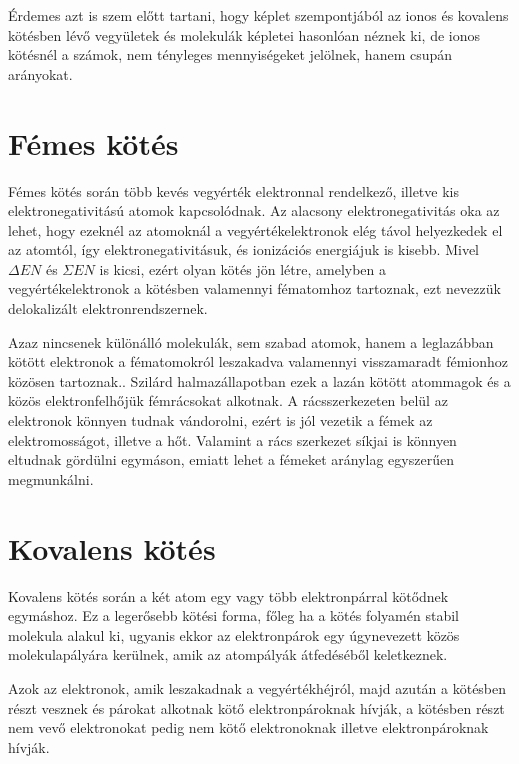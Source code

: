 \documentclass[colorlinks]{thesis-ekf}
\theoremstyle{definition}
\theoremstyle{remark}
\begin{document}
Érdemes azt is szem előtt tartani, hogy képlet szempontjából az ionos és kovalens kötésben lévő vegyületek és molekulák képletei hasonlóan néznek ki, de ionos kötésnél a számok, nem tényleges mennyiségeket jelölnek, hanem csupán arányokat.\cite{ionos_vidi}
\section{Fémes kötés}

Fémes kötés során több kevés vegyérték elektronnal rendelkező, illetve kis elektronegativitású atomok kapcsolódnak. Az alacsony elektronegativitás oka az lehet, hogy ezeknél az atomoknál a vegyértékelektronok elég távol helyezkedek el az atomtól, így elektronegativitásuk, és ionizációs energiájuk is kisebb. Mivel \begin{math}\Delta EN\end{math} és \begin{math}\Sigma EN\end{math} is kicsi, ezért olyan kötés jön létre, amelyben a vegyértékelektronok a kötésben valamennyi fématomhoz tartoznak, ezt nevezzük delokalizált elektronrendszernek.\cite{miskolc_kemia}

Azaz nincsenek különálló molekulák, sem szabad atomok, hanem a leglazábban kötött elektronok a fématomokról leszakadva valamennyi visszamaradt fémionhoz közösen tartoznak.\cite{eke_kemia_ppt}. Szilárd halmazállapotban ezek a lazán kötött atommagok és a közös elektronfelhőjük fémrácsokat alkotnak. A rácsszerkezeten belül az elektronok könnyen tudnak vándorolni, ezért is jól vezetik a fémek az elektromosságot, illetve a hőt.\cite{wiki_femes} Valamint a rács szerkezet síkjai is könnyen eltudnak gördülni egymáson, emiatt lehet a fémeket aránylag egyszerűen megmunkálni.

\section{Kovalens kötés}\label{kovalens}
Kovalens kötés során a két atom egy vagy több elektronpárral kötődnek egymáshoz.\cite{eke_kemia_ppt} Ez a legerősebb kötési forma, főleg ha a kötés folyamén stabil molekula alakul ki, ugyanis ekkor az elektronpárok egy úgynevezett közös molekulapályára kerülnek\cite{miskolc_kemia}, amik az atompályák átfedéséből keletkeznek.\cite{eke_kemia_ppt}

Azok az elektronok, amik leszakadnak a vegyértékhéjról, majd azután a kötésben részt vesznek és párokat alkotnak kötő elektronpároknak hívják, a kötésben részt nem vevő elektronokat pedig nem kötő elektronoknak illetve elektronpároknak hívják.\cite{eke_kemia_ppt}
\end{document}
